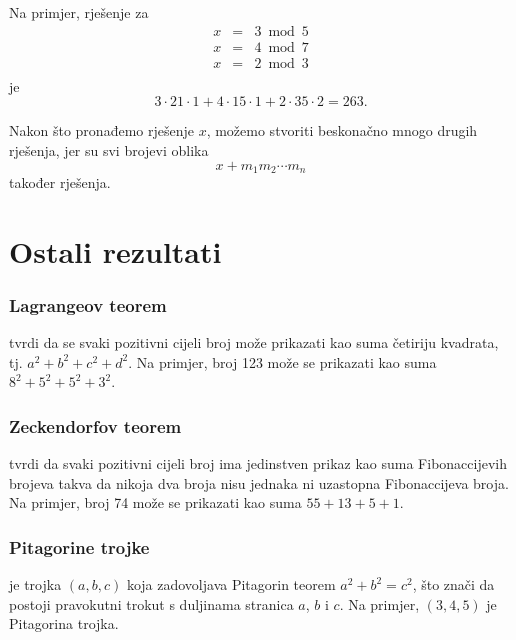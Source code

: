 Na primjer, rješenje za
\[
\begin{array}{lcl}
x & = & 3 \bmod 5 \\
x & = & 4 \bmod 7 \\
x & = & 2 \bmod 3 \\
\end{array}
\]
je
\[ 3 \cdot 21 \cdot 1 + 4 \cdot 15 \cdot 1 + 2 \cdot 35 \cdot 2 = 263.\]

Nakon što pronađemo rješenje $x$,
možemo stvoriti beskonačno mnogo drugih rješenja,
jer su svi brojevi oblika
\[x+m_1 m_2 \cdots m_n\]
također rješenja.

\section{Ostali rezultati}

\subsubsection{Lagrangeov teorem}


tvrdi da se svaki pozitivni cijeli broj
može prikazati kao suma četiriju kvadrata, tj.
$a^2+b^2+c^2+d^2$.
Na primjer, broj 123 može se prikazati
kao suma $8^2+5^2+5^2+3^2$.

\subsubsection{Zeckendorfov teorem}


tvrdi da svaki
pozitivni cijeli broj ima jedinstven prikaz
kao suma Fibonaccijevih brojeva takva da
nikoja dva broja nisu jednaka ni uzastopna
Fibonaccijeva broja.
Na primjer, broj 74 može se prikazati
kao suma $55+13+5+1$.

\subsubsection{Pitagorine trojke}


 je trojka $(a,b,c)$
koja zadovoljava Pitagorin teorem
$a^2+b^2=c^2$, što znači da postoji pravokutni trokut
s duljinama stranica $a$, $b$ i $c$.
Na primjer, $(3,4,5)$ je Pitagorina trojka.

